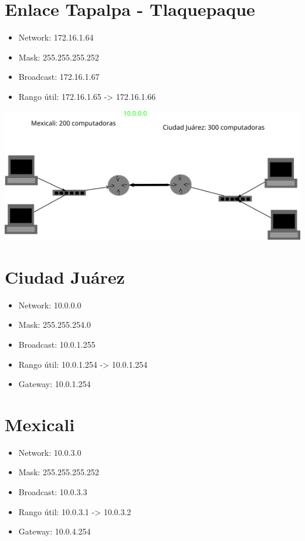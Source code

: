 \documentclass[11pt]{article}
\begin{document}
\section{Enlace Tapalpa - Tlaquepaque}
\label{sec:org99fcdc3}
\begin{itemize}
\item Network: 172.16.1.64
\item Mask: 255.255.255.252
\item Broadcast: 172.16.1.67
\item Rango útil: 172.16.1.65 -> 172.16.1.66
\end{itemize}

\begin{center}
\includegraphics[width=.9\linewidth]{./ejercicio2.png}
\end{center}

\section{Ciudad Juárez}
\label{sec:orgc1aa1f6}
\begin{itemize}
\item Network: 10.0.0.0
\item Mask: 255.255.254.0
\item Broadcast: 10.0.1.255
\item Rango útil: 10.0.1.254 -> 10.0.1.254
\item Gateway: 10.0.1.254
\end{itemize}

\section{Mexicali}
\label{sec:orga8513d0}
\begin{itemize}
\item Network: 10.0.3.0
\item Mask: 255.255.255.252
\item Broadcast: 10.0.3.3
\item Rango útil: 10.0.3.1 -> 10.0.3.2
\item Gateway: 10.0.4.254
\end{itemize}
\end{document}
